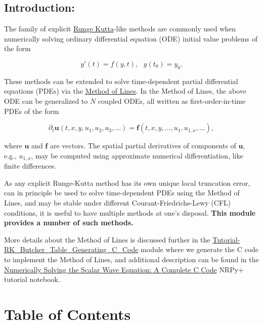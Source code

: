 \documentclass[landscape,letterpaper,10pt,english]{article}
\begin{document}
\hypertarget{introduction}{%
\subsection{Introduction:}\label{introduction}}

The family of explicit
\href{https://en.wikipedia.org/w/index.php?title=Runge\%E2\%80\%93Kutta_methods\&oldid=898536315}{Runge
Kutta}-like methods are commonly used when numerically solving ordinary
differential equation (ODE) initial value problems of the form

\[ y'(t) = f(y,t),\ \ \ y(t_0)=y_0.\]

These methods can be extended to solve time-dependent partial
differential equations (PDEs) via the
\href{https://en.wikipedia.org/w/index.php?title=Method_of_lines\&oldid=855390257}{Method
of Lines}. In the Method of Lines, the above ODE can be generalized to
\(N\) coupled ODEs, all written as first-order-in-time PDEs of the form

\[ \partial_{t}\mathbf{u}(t,x,y,u_1,u_2,u_3,...)=\mathbf{f}(t,x,y,...,u_1,u_{1,x},...),\]

where \(\mathbf{u}\) and \(\mathbf{f}\) are vectors. The spatial partial
derivatives of components of \(\mathbf{u}\), e.g., \(u_{1,x}\), may be
computed using approximate numerical differentiation, like finite
differences.

As any explicit Runge-Kutta method has its own unique local truncation
error, can in principle be used to solve time-dependent PDEs using the
Method of Lines, and may be stable under different
Courant-Friedrichs-Lewy (CFL) conditions, it is useful to have multiple
methods at one's disposal. \textbf{This module provides a number of such
methods.}

More details about the Method of Lines is discussed further in the
\href{Tutorial-RK_Butcher_Table_Generating_C_Code.ipynb}{Tutorial-RK\_Butcher\_Table\_Generating\_C\_Code}
module where we generate the C code to implement the Method of Lines,
and additional description can be found in the
\href{Tutorial-Start_to_Finish-ScalarWave.ipynb}{Numerically Solving the
Scalar Wave Equation: A Complete C Code} NRPy+ tutorial notebook.

    \hypertarget{table-of-contents}{%
\section{Table of Contents}\label{table-of-contents}}

\[\label{toc}\]
\end{document}
